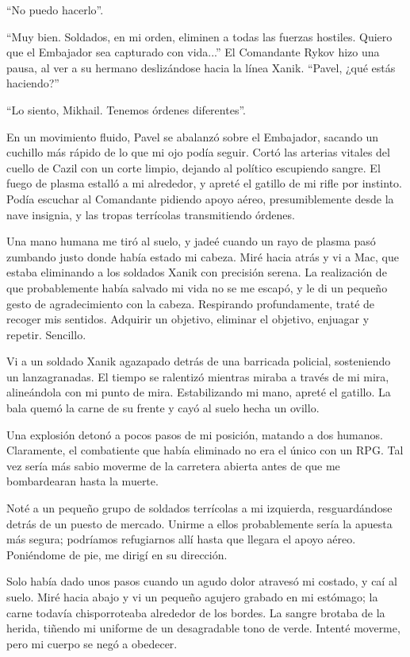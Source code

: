 \documentclass[spanish,12pt,a4paper,oneside,titlepage]{book}
\begin{document}
    ``No puedo hacerlo''.

    ``Muy bien. Soldados, en mi orden, eliminen a todas las fuerzas hostiles. Quiero que el Embajador sea capturado con vida...'' El Comandante Rykov hizo una pausa, al ver a su hermano deslizándose hacia la línea Xanik. ``Pavel, ¿qué estás haciendo?''

    ``Lo siento, Mikhail. Tenemos órdenes diferentes''.

    En un movimiento fluido, Pavel se abalanzó sobre el Embajador, sacando un cuchillo más rápido de lo que mi ojo podía seguir. Cortó las arterias vitales del cuello de Cazil con un corte limpio, dejando al político escupiendo sangre. El fuego de plasma estalló a mi alrededor, y apreté el gatillo de mi rifle por instinto. Podía escuchar al Comandante pidiendo apoyo aéreo, presumiblemente desde la nave insignia, y las tropas terrícolas transmitiendo órdenes.

    Una mano humana me tiró al suelo, y jadeé cuando un rayo de plasma pasó zumbando justo donde había estado mi cabeza. Miré hacia atrás y vi a Mac, que estaba eliminando a los soldados Xanik con precisión serena. La realización de que probablemente había salvado mi vida no se me escapó, y le di un pequeño gesto de agradecimiento con la cabeza. Respirando profundamente, traté de recoger mis sentidos. Adquirir un objetivo, eliminar el objetivo, enjuagar y repetir. Sencillo.

    Vi a un soldado Xanik agazapado detrás de una barricada policial, sosteniendo un lanzagranadas. El tiempo se ralentizó mientras miraba a través de mi mira, alineándola con mi punto de mira. Estabilizando mi mano, apreté el gatillo. La bala quemó la carne de su frente y cayó al suelo hecha un ovillo.

    Una explosión detonó a pocos pasos de mi posición, matando a dos humanos. Claramente, el combatiente que había eliminado no era el único con un RPG. Tal vez sería más sabio moverme de la carretera abierta antes de que me bombardearan hasta la muerte.

    Noté a un pequeño grupo de soldados terrícolas a mi izquierda, resguardándose detrás de un puesto de mercado. Unirme a ellos probablemente sería la apuesta más segura; podríamos refugiarnos allí hasta que llegara el apoyo aéreo. Poniéndome de pie, me dirigí en su dirección.

    Solo había dado unos pasos cuando un agudo dolor atravesó mi costado, y caí al suelo. Miré hacia abajo y vi un pequeño agujero grabado en mi estómago; la carne todavía chisporroteaba alrededor de los bordes. La sangre brotaba de la herida, tiñendo mi uniforme de un desagradable tono de verde. Intenté moverme, pero mi cuerpo se negó a obedecer.
\end{document}

